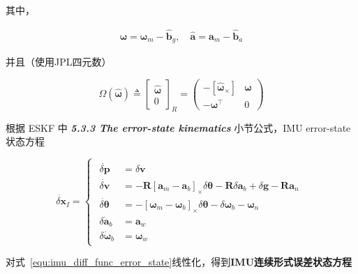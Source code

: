 \documentclass[12pt,a4paper]{article}
\begin{document}
其中，

\begin{equation*}
\begin{aligned}
\hat{\boldsymbol{\omega}} = \boldsymbol{\omega}_m - \hat{\mathbf{b}}_g, \quad
\hat{\mathbf{a}} = \mathbf{a}_m - \hat{\mathbf{b}}_a
\end{aligned}
\end{equation*}

并且（使用JPL四元数）

\begin{equation*}
\Omega\left(\hat{\boldsymbol{\omega}}\right) 
\triangleq 
{\begin{bmatrix}
\hat{\boldsymbol{\omega}} \\ 0
\end{bmatrix}}_R
= 
\begin{pmatrix}
-[\hat{\boldsymbol{\omega}}_\times] & \boldsymbol{\omega} \\
-\boldsymbol{\omega}^\top & 0
\end{pmatrix}
\end{equation*}

根据 \cite{DBLP:journals/corr/abs-1711-02508} ESKF 中 \textit{\textbf{5.3.3 The error-state kinematics}} 小节公式，IMU error-state状态方程

\begin{equation}
\label{equ:imu_diff_func_error_state}
\dot{\delta \mathbf{x}}_{I} = 
\begin{cases}
\begin{aligned}
\dot{\delta \mathbf{p}} &= \delta \mathbf{v} \\
\dot{\delta \mathbf{v}} &= -\mathbf{R}\left[\mathbf{a}_{m}-\mathbf{a}_{b}\right]_{ \times} \delta \boldsymbol{\theta}-\mathbf{R} \delta \mathbf{a}_{b}+\delta \mathbf{g}-\mathbf{R} \mathbf{a}_{n} \\
\dot{\delta \boldsymbol{\theta}} &= -\left[\boldsymbol{\omega}_{m}-\boldsymbol{\omega}_{b}\right]_{ \times} \delta \boldsymbol{\theta}-\delta \boldsymbol{\omega}_{b}-\boldsymbol{\omega}_{n} \\
\delta \dot{\mathbf{a}}_{b} &= \mathbf{a}_{w} \\ 
\delta \dot{\boldsymbol{\omega}}_{b} &= \boldsymbol{\omega}_{w}
\end{aligned}
\end{cases}
\end{equation}

对式~\eqref{equ:imu_diff_func_error_state}线性化，得到\textbf{IMU连续形式误差状态方程}
\end{document}
